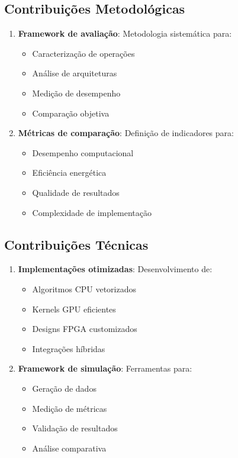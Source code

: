 \subsection{Contribuições Metodológicas}
\begin{enumerate}
    \item \textbf{Framework de avaliação}: Metodologia sistemática para:
    \begin{itemize}
        \item Caracterização de operações
        \item Análise de arquiteturas
        \item Medição de desempenho
        \item Comparação objetiva
    \end{itemize}
    
    \item \textbf{Métricas de comparação}: Definição de indicadores para:
    \begin{itemize}
        \item Desempenho computacional
        \item Eficiência energética
        \item Qualidade de resultados
        \item Complexidade de implementação
    \end{itemize}
\end{enumerate}

\subsection{Contribuições Técnicas}
\begin{enumerate}
    \item \textbf{Implementações otimizadas}: Desenvolvimento de:
    \begin{itemize}
        \item Algoritmos CPU vetorizados
        \item Kernels GPU eficientes
        \item Designs FPGA customizados
        \item Integrações híbridas
    \end{itemize}
    
    \item \textbf{Framework de simulação}: Ferramentas para:
    \begin{itemize}
        \item Geração de dados
        \item Medição de métricas
        \item Validação de resultados
        \item Análise comparativa
    \end{itemize}
\end{enumerate}

